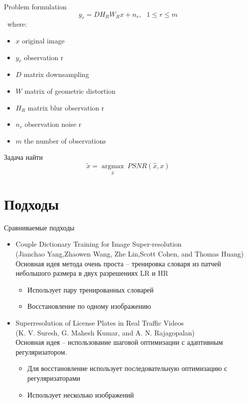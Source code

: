 \begin{frame}{Problem formulation}
 $$y_r = D H_R W_R x + n_r,~ ~ ~ 1 \leq r \leq m$$
 where:
 \begin{itemize}
\item $ x $ original image 
\item $ y_r $ observation r    
\item $ D $ matrix downsampling    
\item $ W $ matrix of geometric distortion    
\item $ H_R $ matrix blur observation r    
\item $ n_r $ observation noise r    
\item $ m $ the number of observations 
 \end{itemize}
 Задача найти
 $$ \tilde{x} = \underset{\hat{x}}{\operatorname{argmax}}~  PSNR(\hat{x},x)$$
\end{frame}
\section{Подходы}
\begin{frame}{Сравниваемые подходы}
  \begin{itemize}
    \item Couple Dictionary Training for Image Super-resolution \\
        (Jianchao Yang,Zhaowen Wang, Zhe Lin,Scott Cohen, and Thomas Huang) \\
  Основная идея метода очень проста -- тренировка словаря из патчей небольшого размера в двух разрешениях LR и HR
      \begin{itemize}
        \item Использует пару тренированных словарей
        \item Восстановление по одному изображению
      \end{itemize}
    \item Superresolution of License Plates in Real Traffic Videos \\
      (K. V. Suresh, G. Mahesh Kumar, and A. N. Rajagopalan) \\
      Основная идея -- использование шаговой оптимизации с адаптивным регуляризатором.
      \begin{itemize}
        \item Для восстановление использует последовательную оптимизацию с
          регуляризаторами
        \item Использует несколько изображений
      \end{itemize}
  \end{itemize}
\end{frame}

